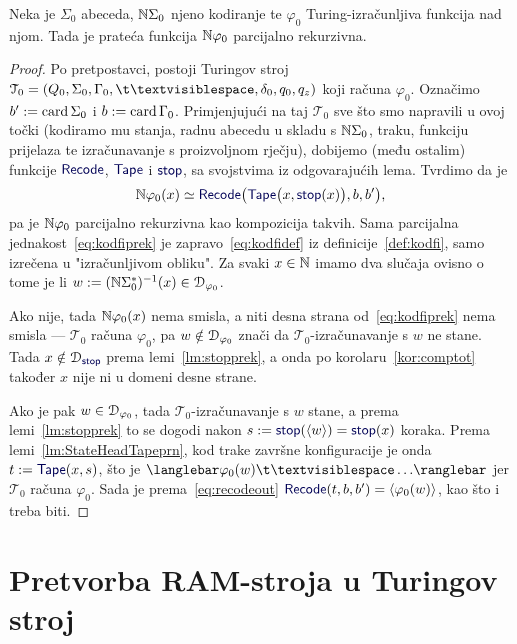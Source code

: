 \begin{teorem}[{name=[parcijalna rekurzivnost pratećih Turing-izračunljivih funkcija]}]\label{tm:tikp}
Neka je $\Sigma_0$ abeceda, ${\mathbb N}\Sigma_0$ njeno kodiranje te $\varphi_0$ Turing-izračunljiva funkcija nad njom. Tada je prateća funkcija ${\mathbb N}\varphi_0$ parcijalno rekurzivna.
\end{teorem}
\begin{proof}
Po pretpostavci, postoji Turingov stroj $\mathcal T_0=(Q_0,\Sigma_0,\Gamma_0,\bl,\delta_0,q_0,q_z)$ koji računa $\varphi_0$. Označimo $b':=\operatorname{card}\Sigma_0$ i $b:=\operatorname{card}\Gamma_0$. Primjenjujući na taj $\mathcal T_0$ sve što smo napravili u ovoj točki (kodiramo mu stanja, radnu abecedu u skladu s ${\mathbb N}\Sigma_0$, traku, funkciju prijelaza te izračunavanje s proizvoljnom rječju), dobijemo (među ostalim) funkcije $\f{Recode}$, $\f{Tape}$ i $\f{stop}$, sa svojstvima iz odgovarajućih lema. Tvrdimo da je
\begin{equation}\label{eq:kodfiprek}
    \N\varphi_0(x)\simeq
    \f{Recode}\bigl(\f{Tape}\bigl(x,\f{stop}(x)\bigr),b,b'\bigr)\text,
\end{equation}
pa je ${\mathbb N}\varphi_0$ parcijalno rekurzivna kao kompozicija takvih. Sama parcijalna jednakost~\eqref{eq:kodfiprek} je zapravo~\eqref{eq:kodfidef} iz definicije~\ref{def:kodfi}, samo izrečena u "izračunljivom obliku". Za svaki $x\in{\mathbb N}$ imamo dva slučaja ovisno o tome je li $w:=({\mathbb N}\Sigma_0^*)^{-1}(x)\in\mathcal D_{\varphi_0}$.

Ako nije, tada ${\mathbb N}\varphi_0(x)$ nema smisla, a niti desna strana od~\eqref{eq:kodfiprek} nema smisla --- $\mathcal T_0$ računa $\varphi_0$, pa $w\notin\mathcal D_{\varphi_0}$ znači da $\mathcal T_0$-izračunavanje s $w$ ne stane. Tada $x\notin\dom{\f{stop}}$ prema lemi~\ref{lm:stopprek}, a onda po korolaru~\ref{kor:comptot} također $x$ nije ni u domeni desne strane.

Ako je pak $w\in\mathcal D_{\varphi_0}$, tada $\mathcal T_0$-izračunavanje s $w$ stane, a prema lemi~\ref{lm:stopprek} to se dogodi nakon $s:=\f{stop}(\kr w)=\f{stop}(x)$ koraka. Prema lemi~\ref{lm:StateHeadTapeprn}, kod trake završne konfiguracije je onda $t:=\f{Tape}(x,s)$, što je $\knk{\varphi_0(w)\bl\ldots}$ jer $\mathcal T_0$ računa $\varphi_0$. Sada je prema~\eqref{eq:recodeout} $\f{Recode}(t,b,b')=\kr{\varphi_0(w)}$, kao što i treba biti.
\end{proof}

\section{Pretvorba RAM-stroja u Turingov stroj}\label{sec:RAM>Turing}

